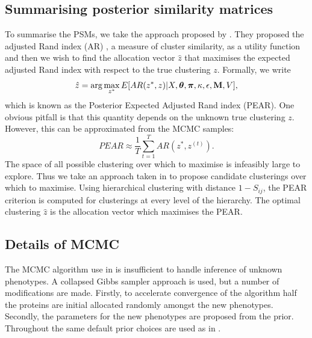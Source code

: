 \documentclass[12pt,english]{article}
\begin{document}
\subsection{Summarising posterior similarity matrices}
To summarise the PSMs, we take the approach proposed by \cite{fritsch::2009}. They proposed the adjusted Rand index (AR) \citep{rand::1971, Hubert::1985}, a measure of cluster similarity, as a utility function and then we wish to find the allocation vector $\hat{z}$ that maximises the expected adjusted Rand index with respect to the true clustering $z$. Formally, we write
\begin{equation}
\hat{z} = \arg \max_{z^*} E[AR(z^*, z)|X, \boldsymbol{\theta}, \boldsymbol{\pi} , \kappa, \epsilon, {\bf M}, V],
\end{equation}
which is known as the Posterior Expected Adjusted Rand index (PEAR). One obvious pitfall is that this quantity depends on the unknown true clustering $z$. However, this can be approximated from the MCMC samples:
\begin{equation}
PEAR \approx \frac{1}{T} \sum_{t = 1}^{T}AR(z^*, z^{(t)}).
\end{equation}
The space of all possible clustering over which to maximise is infeasibly large to explore. Thus we take an approach taken in \cite{fritsch::2009} to propose candidate clusterings over which to maximise. Using hierarchical clustering with distance $1 - S_{ij}$, the PEAR criterion is computed for clusterings at every level of the hierarchy. The optimal clustering $\hat{z}$ is the allocation vector which maximises the PEAR.
\subsection{Details of MCMC}
The MCMC algorithm use in \cite{Crook:2018} is insufficient to handle inference of unknown phenotypes. A collapsed Gibbs sampler approach is used, but a number of modifications are made. Firstly, to accelerate convergence of the algorithm half the proteins are initial allocated randomly amongst the new phenotypes. Secondly, the parameters for the new phenotypes are proposed from the prior. Throughout the same default prior choices are used as in \cite{Crook:2018}.
\end{document}
